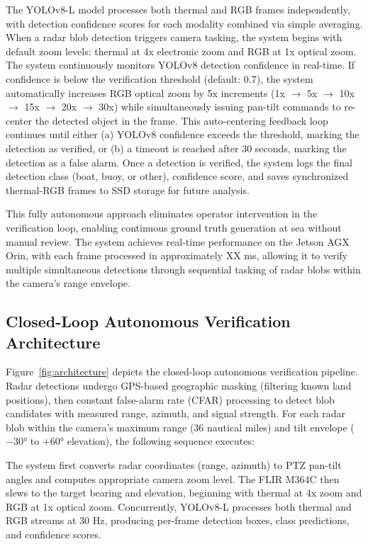 \documentclass[twocolumn, 10pt]{article}
\begin{document}
The YOLOv8-L model processes both thermal and RGB frames independently, with detection confidence scores for each modality combined via simple averaging. When a radar blob detection triggers camera tasking, the system begins with default zoom levels: thermal at 4x electronic zoom and RGB at 1x optical zoom. The system continuously monitors YOLOv8 detection confidence in real-time. If confidence is below the verification threshold (default: 0.7), the system automatically increases RGB optical zoom by 5x increments (1x $\to$ 5x $\to$ 10x $\to$ 15x $\to$ 20x $\to$ 30x) while simultaneously issuing pan-tilt commands to re-center the detected object in the frame. This auto-centering feedback loop continues until either (a) YOLOv8 confidence exceeds the threshold, marking the detection as verified, or (b) a timeout is reached after 30 seconds, marking the detection as a false alarm. Once a detection is verified, the system logs the final detection class (boat, buoy, or other), confidence score, and saves synchronized thermal-RGB frames to SSD storage for future analysis.

This fully autonomous approach eliminates operator intervention in the verification loop, enabling continuous ground truth generation at sea without manual review. The system achieves real-time performance on the Jetson AGX Orin, with each frame processed in approximately XX ms, allowing it to verify multiple simultaneous detections through sequential tasking of radar blobs within the camera's range envelope.

\subsection{Closed-Loop Autonomous Verification Architecture}

Figure~\ref{fig:architecture} depicts the closed-loop autonomous verification pipeline. Radar detections undergo GPS-based geographic masking (filtering known land positions), then constant false-alarm rate (CFAR) processing to detect blob candidates with measured range, azimuth, and signal strength. For each radar blob within the camera's maximum range (36 nautical miles) and tilt envelope ($-30°$ to $+60°$ elevation), the following sequence executes:

The system first converts radar coordinates (range, azimuth) to PTZ pan-tilt angles and computes appropriate camera zoom level. The FLIR M364C then slews to the target bearing and elevation, beginning with thermal at 4x zoom and RGB at 1x optical zoom. Concurrently, YOLOv8-L processes both thermal and RGB streams at 30 Hz, producing per-frame detection boxes, class predictions, and confidence scores.
\end{document}
